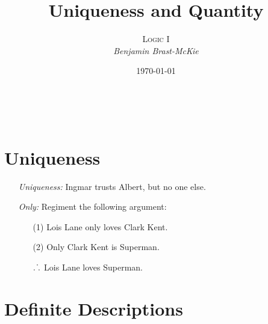 \documentclass[a4paper, 11pt]{article} %
\title{\textbf{Uniqueness and Quantity}} %
\author{\textsc{Logic I}\\ \em Benjamin Brast-McKie} %
\date{\today} %
\makeatletter
\def\therefore{\ensuremath{\ldotp\dot\,\ldotp}}
\renewcommand{\maketitle}{ %
\begin{flushright} %
{\LARGE\@title} %

\vspace{10pt} %

{\@author} %
\\\@date %

\vspace{60pt} %
\end{flushright}
}
\makeatother
\begin{document}
\maketitle %

\thispagestyle{empty}





\section*{Uniqueness}

\begin{enumerate}
  \item[\it Uniqueness:] Ingmar trusts Albert, but no one else.
  \item[\it Only:] Regiment the following argument:
    \begin{itemize}
      \item[(1)] Lois Lane only loves Clark Kent.
      \item[(2)] Only Clark Kent is Superman.
      \item[$\therefore$] Lois Lane loves Superman.
    \end{itemize}
\end{enumerate}





\section*{Definite Descriptions}
\end{document}
